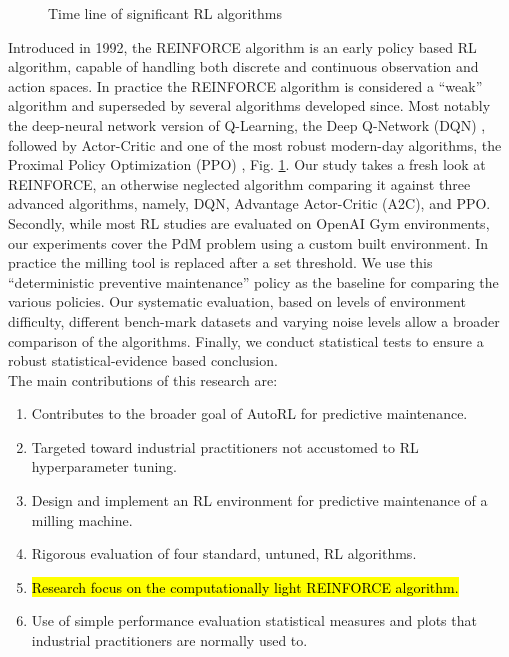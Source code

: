 \documentclass[referee, sn-mathphys-num]{sn-jnl}
\newcommand{\hlc}[2][cyan!15]{{\colorlet{foo}{#1}\sethlcolor{foo}\hl{#2}}}
\begin{document}
	\begin{figure}[hbt!]	
		\startchronology[startyear=1940, startdate=false, stopdate=false, arrow=false, color=codegray, height=.5ex]
		\stopchronology
		\vspace{-36pt}
		\caption{Time line of significant RL algorithms}
		\label{fig_TimeLine}
	\end{figure}
	Introduced in 1992, the REINFORCE algorithm \cite{REINFORCE-williams1992} is an early policy based RL algorithm, capable of handling both discrete and continuous observation and action spaces. In practice the REINFORCE algorithm is considered a ``weak'' algorithm and superseded by several algorithms developed since. Most notably the deep-neural network version of Q-Learning, the Deep Q-Network (DQN) \cite{DQN-mnih2013}, followed by Actor-Critic \cite{A2C-mnih2016} and one of the most robust modern-day algorithms, the Proximal Policy Optimization (PPO) \cite{PPO-schulman2017}, Fig. \ref{fig_TimeLine}. Our study takes a fresh look at REINFORCE, an otherwise neglected algorithm comparing it against three advanced algorithms, namely, DQN, Advantage Actor-Critic (A2C), and PPO. Secondly, while most RL studies are evaluated on OpenAI Gym environments, our experiments cover the PdM problem using a custom built environment. In practice the milling tool is replaced after a set threshold. We use this ``deterministic preventive maintenance'' policy as the baseline for comparing the various policies. Our systematic evaluation, based on levels of environment difficulty, different bench-mark datasets and varying noise levels allow a broader comparison of the algorithms. Finally, we conduct statistical tests to ensure a robust statistical-evidence based conclusion.\\
	
	The main contributions of this research are:
	\begin{enumerate}
		\item Contributes to the broader goal of AutoRL for predictive maintenance.
		\item Targeted toward industrial practitioners not accustomed to RL hyperparameter tuning.
		\item Design and implement an RL environment for predictive maintenance of a milling machine.
		\item Rigorous evaluation of four standard, untuned, RL algorithms.
		\item \hlc{Research focus on the computationally light REINFORCE algorithm.}
		\item Use of simple performance evaluation statistical measures and plots that industrial practitioners are normally used to.
	\end{enumerate} 
	
\end{document}
